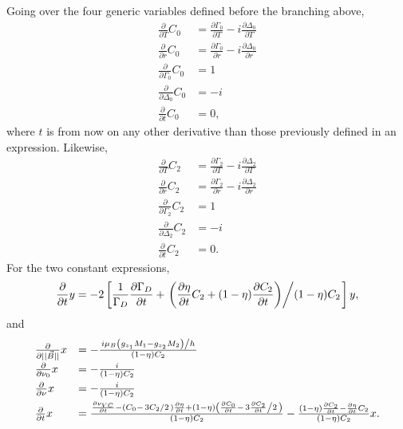 Going over the four generic variables defined before the branching above,
\begin{equation}
 \begin{array}{ll}
  \frac{\partial}{\partial T} C_0 &= \frac{\partial \Gamma_0}{\partial T} - i\frac{\partial \Delta_0}{\partial T} \\[5pt]
  \frac{\partial}{\partial r} C_0 &= \frac{\partial \Gamma_0}{\partial r} - i\frac{\partial \Delta_0}{\partial r} \\[5pt]
  \frac{\partial}{\partial \Gamma_0} C_0 &= 1 \\[5pt]
  \frac{\partial}{\partial \Delta_0} C_0 &= -i \\[5pt]
  \frac{\partial}{\partial t} C_0 &= 0,
 \end{array}
\end{equation}
where $t$ is from now on any other derivative than those previously defined in 
an expression.  Likewise,
\begin{equation}
 \begin{array}{ll}
  \frac{\partial}{\partial T} C_2 &= \frac{\partial \Gamma_2}{\partial T} - i\frac{\partial \Delta_2}{\partial T} \\[5pt]
  \frac{\partial}{\partial r} C_2 &= \frac{\partial \Gamma_2}{\partial r} - i\frac{\partial \Delta_2}{\partial r} \\[5pt]
  \frac{\partial}{\partial \Gamma_2} C_2 &= 1 \\[5pt]
  \frac{\partial}{\partial \Delta_2} C_2 &= -i \\[5pt]
  \frac{\partial}{\partial t} C_2 &= 0.
 \end{array}
\end{equation}
For the two constant expressions,
\begin{equation}
 \frac{\partial}{\partial t} y = -2 \left[ \frac{1}{\Gamma_D}\frac{\partial \Gamma_D}{\partial t} + \left. \left(\frac{\partial \eta}{\partial t}C_2 + (1-\eta)\frac{\partial C_2}{\partial t}\right) \middle/ (1-\eta)C_2 \right. \right] y,
\end{equation}
and
\begin{equation}
 \begin{array}{ll}
  \frac{\partial}{\partial ||\vec{B}||} x &= -\frac{\left.i\mu_B\left(g_{z_1}M_1 - g_{z_2}M_2\right)\middle/h\right.}{(1-\eta)C_2} \\[5pt]
  \frac{\partial}{\partial \nu_0} x &= -\frac{i}{(1-\eta)C_2} \\[5pt]
  \frac{\partial}{\partial \nu} x &= -\frac{i}{(1-\eta)C_2} \\[5pt]
  \frac{\partial}{\partial t} x &= \frac{\frac{\partial \nu_{VC}}{\partial t} - \left(C_0 - \left.3C_2\middle/2\right.\right)\frac{\partial \eta}{\partial t} + (1-\eta)\left(\frac{\partial C_0}{\partial t} - \left.3\frac{\partial C_2}{\partial t}\middle/2\right.\right)}{(1-\eta)C_2}-\frac{(1-\eta)\frac{\partial C_2}{\partial t} - \frac{\partial\eta}{\partial t}C_2}{(1-\eta)C_2}x.
 \end{array}
\end{equation}

